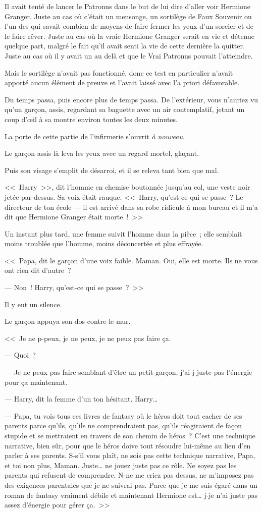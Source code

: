 Il avait tenté de lancer le Patronus dans le but de lui dire d'aller voir Hermione Granger. Juste au cas où c'était un mensonge, un sortilège de Faux Souvenir ou l'un des qui-savait-combien de moyens de faire fermer les yeux d'un sorcier et de le faire rêver. Juste au cas où la vraie Hermione Granger serait en vie et détenue quelque part, malgré le fait qu'il avait senti la vie de cette dernière la quitter. Juste au cas où il y avait un au delà et que le Vrai Patronus pouvait l'atteindre.

Mais le sortilège n'avait pas fonctionné, donc ce test en particulier n'avait apporté aucun élément de preuve et l'avait laissé avec l'a priori défavorable.

Du temps passa, puis encore plus de temps passa. De l'extérieur, vous n'auriez vu qu'un garçon, assis, regardant sa baguette avec un air contemplatif, jetant un coup d'œil à sa montre environ toutes les deux minutes.

La porte de cette partie de l'infirmerie s'ouvrit \emph{à nouveau}.

Le garçon assis là leva les yeux avec un regard mortel, glaçant.

Puis son visage s'emplit de désarroi, et il se releva tant bien que mal.

<<~Harry~>>, dit l'homme en chemise boutonnée jusqu'au col, une veste noir jetée par-dessus. Sa voix était rauque. <<~Harry, qu'est-ce qui se passe~? Le directeur de ton école — il est arrivé dans sa robe ridicule à mon bureau et il m'a dit que Hermione Granger était morte~!~>>

Un instant plus tard, une femme suivit l'homme dans la pièce~; elle semblait moins troublée que l'homme, moins déconcertée et plus effrayée.

<<~Papa, dit le garçon d'une voix faible. Maman. Oui, elle est morte. Ils ne vous ont rien dit d'autre~?

--- Non~! Harry, qu'est-ce qui se passe~?~>>

Il y eut un silence.

Le garçon appuya son dos contre le mur.

<<~Je ne p-peux, je ne peux, je ne peux pas faire ça.

--- Quoi~?

--- Je ne peux pas faire semblant d'être un petit garçon, j'ai j-juste pas l'énergie pour ça maintenant.

--- Harry, dit la femme d'un ton hésitant. Harry…

--- Papa, tu vois tous ces livres de fantasy où le héros doit tout cacher de ses parents parce qu'ils, qu'ils ne comprendraient pas, qu'ils réagiraient de façon stupide et se mettraient en travers de son chemin de héros~? C'est une technique narrative, bien sûr, pour que le héros doive tout résoudre lui-même au lieu d'en parler à ses parents. S-s'il vous plaît, ne sois pas cette technique narrative, Papa, et toi non plus, Maman. Juste… ne jouez juste pas ce rôle. Ne soyez pas les parents qui refusent de comprendre. N-ne me criez pas dessus, ne m'imposez pas des exigences parentales que je ne suivrai pas. Parce que je me suis égaré dans un roman de fantasy vraiment débile et maintenant Hermione est… j-je n'ai juste pas assez d'énergie pour gérer ça.~>>

